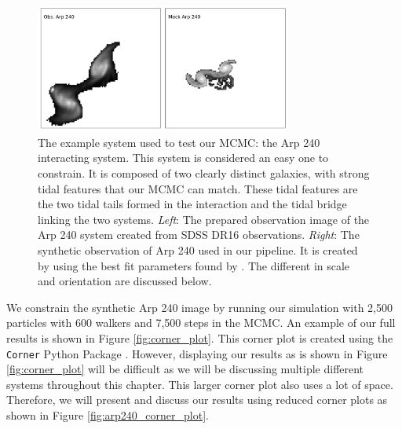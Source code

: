 \begin{figure}
\centering
\includegraphics[width=0.75\textwidth]{Chapter1/figures/arp240-obs-sim.pdf}
\caption[The example system used to test our MCMC: the Arp 240 interacting system.]{The example system used to test our MCMC: the Arp 240 interacting system. This system is considered an easy one to constrain. It is composed of two clearly distinct galaxies, with strong tidal features that our MCMC can match. These tidal features are the two tidal tails formed in the interaction and the tidal bridge linking the two systems. \textit{Left}: The prepared observation image of the Arp 240 system created from SDSS DR16 observations. \textit{Right}: The synthetic observation of Arp 240 used in our pipeline. It is created by using the best fit parameters found by \citet{2016MNRAS.459..720H}. The different in scale and orientation are discussed below.}
\label{fig:arp240}
\end{figure}

We constrain the synthetic Arp 240 image by running our simulation with 2,500 particles with 600 walkers and 7,500 steps in the MCMC. An example of our full results is shown in Figure \ref{fig:corner_plot}. This corner plot is created using the \texttt{Corner} Python Package \citep{corner}. However, displaying our results as is shown in Figure \ref{fig:corner_plot} will be difficult as we will be discussing multiple different systems throughout this chapter. This larger corner plot also uses a lot of space. Therefore, we will present and discuss our results using reduced corner plots as shown in Figure \ref{fig:arp240_corner_plot}.

